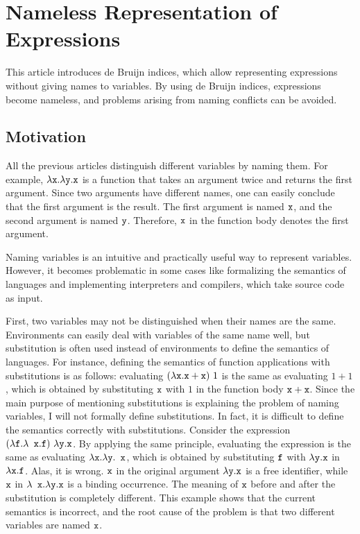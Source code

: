 \setchapterpreamble[u]{\margintoc}
\chapter{Nameless Representation of Expressions}

This article introduces de Bruijn indices, which allow representing expressions
without giving names to variables. By using de Bruijn indices, expressions become
nameless, and problems arising from naming conflicts can be avoided.

\section{Motivation}

All the previous articles distinguish different variables by naming them. For
example, $\lambda \code{x}.\lambda \code{y}.\code{x}$ is a function that takes an
argument twice and returns the first argument. Since two arguments have different
names, one can easily conclude that the first argument is the result. The first
argument is named $\texttt{x}$, and the second argument is named $\texttt{y}$. Therefore,
$\texttt{x}$ in the function body denotes the first argument.

Naming variables is an intuitive and practically useful way to represent
variables. However, it becomes problematic in some cases like formalizing the
semantics of languages and implementing interpreters and compilers, which take
source code as input.

First, two variables may not be distinguished when their names are the same.
Environments can easily deal with variables of the same name well, but
substitution is often used instead of environments to define the semantics of
languages. For instance, defining the semantics of function applications with
substitutions is as follows: evaluating $(\lambda \texttt{x}.\texttt{x} + \texttt{x})\ 1$
is the same as evaluating $1+1$, which is obtained by substituting $\texttt{x}$ with
$1$ in the function body $\texttt{x}+\texttt{x}$. Since the main purpose of mentioning
substitutions is explaining the problem of naming variables, I will not formally
define substitutions. In fact, it is difficult to define the semantics correctly
with substitutions. Consider the expression $(\lambda \texttt{f}.\lambda \texttt{
x}.\texttt{f})\ \lambda \texttt{y}.\texttt{x}$. By applying the same principle, evaluating
the expression is the same as evaluating $\lambda \code{x}.\lambda \code{y}.\code{
x}$, which is obtained by substituting $\texttt{f}$ with $\lambda \texttt{y}.\texttt{x}$ in
$\lambda \texttt{x}.\texttt{f}$. Alas, it is wrong. $\texttt{x}$ in the original argument
$\lambda \texttt{y}.\texttt{x}$ is a free identifier, while $\texttt{x}$ in $\lambda \code{
x}.\lambda \code{y}.\code{x}$ is a binding occurrence. The meaning of $\texttt{x}$
before and after the substitution is completely different. This example shows
that the current semantics is incorrect, and the root cause of the problem is
that two different variables are named $\texttt{x}$.

